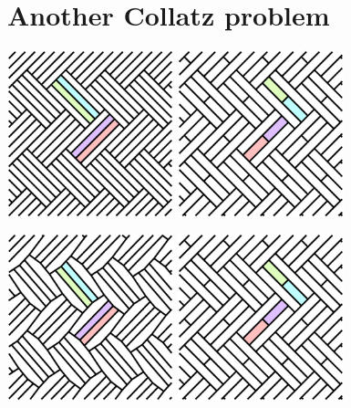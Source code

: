 \documentclass{beamer}
\begin{document}
\section{Another Collatz problem}

\begin{frame}
  \begin{center}
    \includegraphics[width=1.9in]{c01}
    \includegraphics[width=1.9in]{c12}
  \end{center}
\end{frame}

\begin{frame}
  \begin{center}
    \includegraphics[width=1.9in]{c02}
    \includegraphics[width=1.9in]{c12}
  \end{center}
\end{frame}
\end{document}
